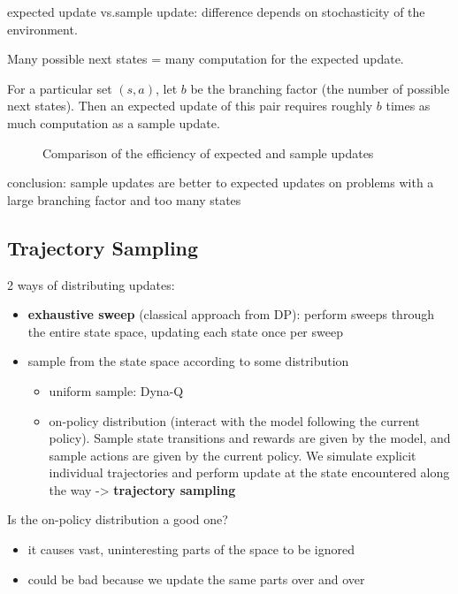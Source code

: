 \documentclass[sutton_barto_notes.tex]{subfiles}
\begin{document}
expected update vs.sample update: difference depends on stochasticity of the environment.

Many possible next states = many computation for the expected update.

For a particular set $(s,a)$, let $b$ be the branching factor (the number of possible next states). Then an expected update of this pair requires roughly $b$ times as much computation as a sample update.

\begin{figure}[h!]
    \centering
    \caption{ Comparison of the efficiency of expected and sample updates }
\end{figure}

conclusion: sample updates are better to expected updates on problems with a large branching factor and too many states


\subsection{Trajectory Sampling}

2 ways of distributing updates:
\begin{itemize}
\item \textbf{exhaustive sweep} (classical approach from DP): perform sweeps through the entire state space, updating each state once per sweep
\item sample from the state space according to some distribution
\begin{itemize}
	\item uniform sample: Dyna-Q
	\item on-policy distribution (interact with the model following the current policy). Sample state transitions and rewards are given by the model, and sample actions are given by the current policy. We simulate explicit individual trajectories and perform update at the state encountered along the way -> \textbf{trajectory sampling}
\end{itemize}
\end{itemize}

Is the on-policy distribution a good one?
\begin{itemize}
\item it causes vast, uninteresting parts of the space to be ignored
\item could be bad because we update the same parts over and over
\end{itemize}
\end{document}
